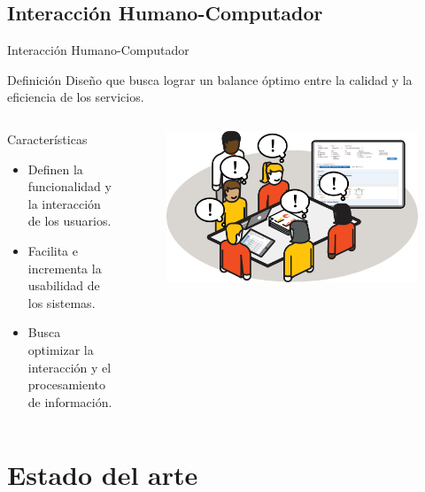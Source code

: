 \documentclass[10pt,xcolor=table ]{beamer}
\begin{document}
\subsection{Interacción Humano-Computador}
\begin{frame}{Interacción Humano-Computador}
	\begin{alertblock}{Definición}
		Diseño que busca lograr un balance óptimo entre la calidad y la eficiencia de los servicios.
	\end{alertblock}

	\begin{columns}[c,onlytextwidth]
		\begin{block}{Características}
			\begin{itemize}
	        	\item Definen la funcionalidad y la interacción de los usuarios.
	        	\item Facilita e incrementa la usabilidad de los sistemas.
	        	\item Busca optimizar la interacción y el procesamiento de información.
	    	\end{itemize}
		\end{block}
		\begin{figure}
		    \includegraphics[scale=0.12]{../Figuras/happy_agile}
		\end{figure}
  	\end{columns}
\end{frame}

\section{Estado del arte}
\end{document}
